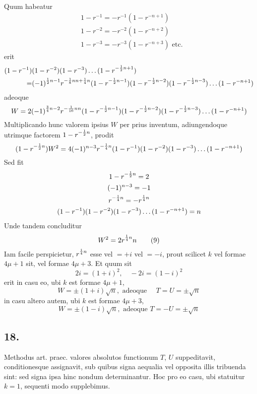 \documentclass[twoside,12pt, showframe]{memoir}
\let\oldfrac\frac
\def\frac#1#2{\mathchoice{\tfrac{#1}{#2}}{\oldfrac{#1}{#2}}{\genfrac{}{}{}{2}{#1}{#2\mathstrut}}{\genfrac{}{}{}{3}{#1}{#2\mathstrut}}}
\begin{document}
Quum habeatur
\[\begin{aligned}
& 1-r^{-1}=-r^{-1}(1-r^{-n+1}) \\
& 1-r^{-2}=-r^{-2}(1-r^{-n+2}) \\
& 1-r^{-3}=-r^{-3}(1-r^{-n+3}) \text{ etc.}
\end{aligned}\]
erit
\[\begin{aligned}
 (1-r^{-1})&(1-r^{-2})(1-r^{-3}) \ldots(1-r^{-\frac{1}{2} n+1}) \\
=&(-1)^{\frac{1}{2} n-1} r^{-\frac{1}{8} n n+\frac{1}{4} n}(1-r^{-\frac{1}{2} n-1})(1-r^{-\frac{1}{2} n-2})(1-r^{-\frac{1}{2} n-3}) \ldots(1-r^{-n+1})
\end{aligned}\]
adeoque
\[W=2(-1)^{\frac{3}{4} n-2} r^{-\frac{1}{16} n n}(1-r^{-\frac{1}{2} n-1})(1-r^{-\frac{1}{2} n-2})(1-r^{-\frac{1}{2} n-3}) \ldots(1-r^{-n+1})\]
Multiplicando hunc valorem ipsius \(W\) per prius inventum, adiungendoque utrimque factorem \(1-r^{-\frac{1}{2} n}\), prodit
\[(1-r^{-\frac{1}{2} n}) W^{2}=4(-1)^{n-3} r^{-\frac{1}{4} n}(1-r^{-1})(1-r^{-2})(1-r^{-3}) \ldots(1-r^{-n+1})\]
Sed fit
\[\begin{gathered}
1-r^{-\frac{1}{2} n}=2 \\
(-1)^{n-3}=-1 \\
r^{-\frac{1}{4} n}=-r^{\frac{1}{4} n} \\
(1-r^{-1})(1-r^{-2})(1-r^{-3}) \ldots(1-r^{-n+1})=n
\end{gathered}\]
Unde tandem concluditur\clearpage\noindent%
\[ W^{2}=2 r^{\frac{1}{4} n} n \tag{9}\]
Iam facile perspicietur, \(r^{\frac{1}{4} n}\) esse vel \(=+i\) vel \(=-i\), prout scilicet \(k\) vel formae \(4 \mu+1\) sit, vel formae \(4 \mu+3\). Et quum sit
\[2 i=(1+i)^{2}, \quad-2 i=(1-i)^{2}\]
erit in casu eo, ubi \(k\) est formae \(4 \mu+1\),
\[W= \pm(1+i) \surd n, \text{ adeoque } \quad T=U= \pm \surd n\]
in casu altero autem, ubi \(k\) est formae \(4 \mu+3\),
\[W= \pm(1-i) \surd n, \text{ adeoque } T=-U= \pm \surd n\]

\subsection*{18.}
 
Methodus art. praec. valores absolutos functionum \(T\), \(U\) suppeditavit, conditionesque assignavit, sub quibus signa aequalia vel opposita illis tribuenda sint: sed signa ipsa hinc nondum determinantur. Hoc pro eo casu, ubi statuitur \(k=1\), sequenti modo supplebimus.
 
\end{document}
